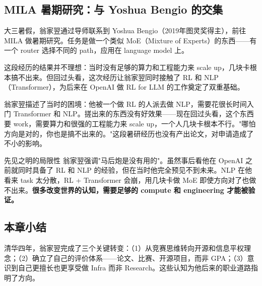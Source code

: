\subsection{MILA 暑期研究：与 Yoshua Bengio 的交集}

大三暑假，翁家翌通过导师联系到 Yoshua Bengio（2019年图灵奖得主），前往 MILA 做暑期研究。任务是做一个类似 MoE（Mixture of Experts）的东西——有一个 router 选择不同的 path，应用在 language model 上。

这段经历的结果并不理想：当时没有足够的算力和工程能力来 scale up，几块卡根本搞不出来。但回过头看，这次经历让翁家翌同时接触了 RL 和 NLP（Transformer），为后来在 OpenAI 做 RL for LLM 的工作奠定了双重基础。

翁家翌描述了当时的困境：他被一个做 RL 的人派去做 NLP，需要花很长时间入门 Transformer 和 NLP。搓出来的东西没有好效果——现在回过头看，这个东西要 work，需要算力和很强的工程能力来 scale up，一个人几块卡根本不行。"哪怕方向是对的，你也是搞不出来的。"这段暑研经历也没有产出论文，对申请造成了不小的影响。

\begin{warningbox}{先见之明的局限性}
翁家翌强调"马后炮是没有用的"。虽然事后看他在 OpenAI 之前就同时具备了 RL 和 NLP 的经验，但在当时他完全预见不到未来。NLP 在他看来 task 太分散，RL + Transformer 会崩，用几块卡做 MoE 即使方向对了也做不出来。\textbf{很多改变世界的认知，需要足够的 compute 和 engineering 才能被验证。}
\end{warningbox}

\subsection{本章小结}

清华四年，翁家翌完成了三个关键转变：（1）从竞赛思维转向开源和信息平权理念；（2）确立了自己的评价体系——论文、比赛、开源项目，而非 GPA；（3）意识到自己更擅长也更享受做 Infra 而非 Research。这些认知为他后来的职业道路指明了方向。


